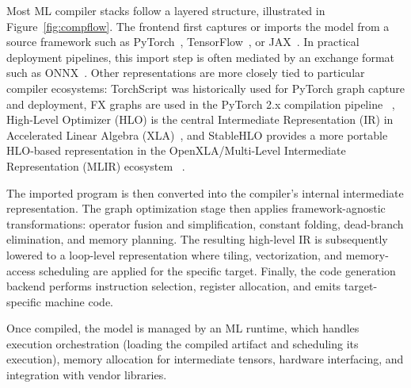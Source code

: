 \documentclass[12pt,a4paper]{report}
\begin{document}
Most ML compiler stacks follow a layered structure, illustrated in Figure~\ref{fig:compflow}.
The frontend first captures or imports the model from a source framework such as
PyTorch~\cite{paszke2019pytorch}, TensorFlow~\cite{abadi2016tensorflow}, or
JAX~\cite{frostig2019compiling}. In practical deployment pipelines, this import step is often
mediated by an exchange format such as ONNX~\cite{microsoft2017onnx}. Other representations are
more closely tied to particular compiler ecosystems: TorchScript was historically used for PyTorch
graph capture and deployment, FX graphs are used in the PyTorch 2.x compilation pipeline
~\cite{reed2022torch}, High-Level Optimizer (HLO) is the central Intermediate Representation (IR) in Accelerated Linear Algebra (XLA)~\cite{openxla_hlo_to_thunks_docs}, and
StableHLO provides a more portable HLO-based representation in the OpenXLA/Multi-Level Intermediate Representation (MLIR) ecosystem
~\cite{openxla_stablehlo_docs}.

The imported program is then converted into the compiler's internal intermediate representation.
The graph optimization stage then applies framework-agnostic transformations: operator fusion
and simplification, constant folding, dead-branch
elimination, and memory planning. The resulting high-level IR is subsequently lowered to a
loop-level representation where tiling, vectorization, and memory-access scheduling are applied for the
specific target. Finally, the code generation backend performs instruction selection, register
allocation, and emits target-specific machine code.

Once compiled, the model is managed by an ML runtime, which handles execution orchestration
(loading the compiled artifact and scheduling its execution), memory allocation for intermediate tensors,
hardware interfacing, and integration with vendor libraries.
\end{document}
